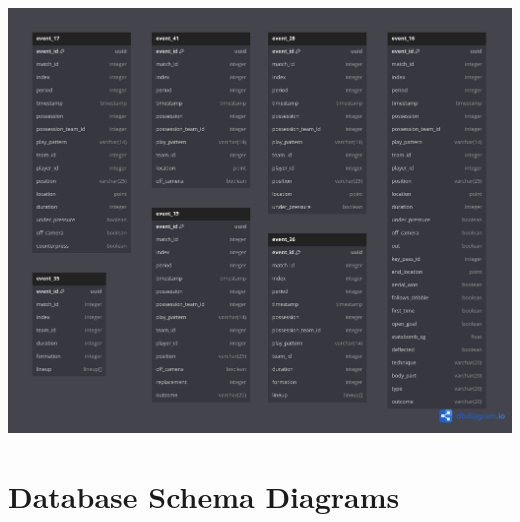 \documentclass[12pt]{article}
\begin{document}
\includegraphics[width=\textwidth]{reduction/6.png}

\section*{Database Schema Diagrams}
\end{document}
